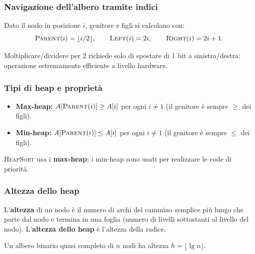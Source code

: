 \subsubsection{Navigazione dell'albero tramite indici}

Dato il nodo in posizione $i$, genitore e figli si calcolano con:
\[
\textsc{Parent}(i) = \lfloor i/2 \rfloor, \qquad
\textsc{Left}(i)   = 2i,               \qquad
\textsc{Right}(i)  = 2i + 1.
\]

\begin{nota}
	Moltiplicare/dividere per 2 richiede solo di spostare di 1 bit a
	sinistra/destra: operazione estremamente efficiente a livello hardware.
\end{nota}

\subsubsection{Tipi di heap e proprietà}

\begin{definizione}
	\begin{itemize}
		\item \textbf{Max-heap:} $A[\textsc{Parent}(i)] \ge A[i]$ per ogni
		$i \ne 1$ (il genitore è sempre $\ge$ dei figli).
		\item \textbf{Min-heap:} $A[\textsc{Parent}(i)] \le A[i]$ per ogni
		$i \ne 1$ (il genitore è sempre $\le$ dei figli).
	\end{itemize}
	\textsc{HeapSort} usa i \textbf{max-heap}; i min-heap sono usati per
	realizzare le code di priorità.
\end{definizione}

\subsubsection{Altezza dello heap}

\begin{definizione}
	L'\textbf{altezza} di un nodo è il numero di archi del cammino
	semplice più lungo che parte dal nodo e termina in una foglia
	(numero di livelli sottostanti al livello del nodo).
	L'\textbf{altezza dello heap} è l'altezza della radice.
\end{definizione}

\begin{teorema}
	Un albero binario quasi completo di $n$ nodi ha altezza
	$h = \lfloor \lg n \rfloor$.
\end{teorema}


